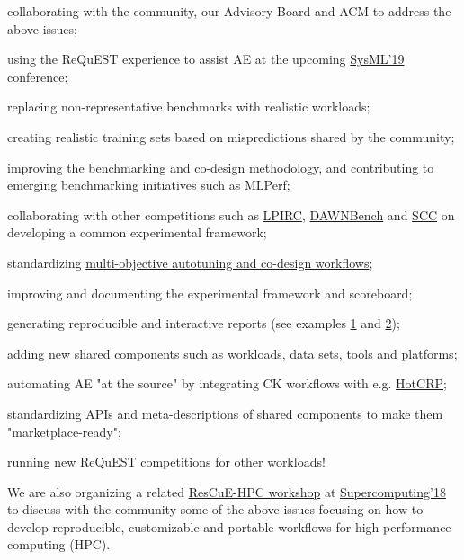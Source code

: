 \documentclass[10pt,onecolumn]{article}
\newenvironment{packed_itemize}{
\begin{itemize}
  \setlength{\itemsep}{1pt}
  \setlength{\parskip}{0pt}
  \setlength{\parsep}{0pt}
}{\end{itemize}}
\begin{document}
\begin{packed_itemize}

\item collaborating with the community, our Advisory Board and ACM to address the above issues;
\item using the ReQuEST experience to assist AE at the upcoming \href{http://sysml.cc}{SysML'19} conference;
\item replacing non-representative benchmarks with realistic workloads;
\item creating realistic training sets based on mispredictions shared by the community;
\item improving the benchmarking and co-design methodology, and contributing to emerging benchmarking initiatives such as \href{http://mlperf.org}{MLPerf};
\item collaborating with other competitions such as \href{https://rebootingcomputing.ieee.org/lpirc}{LPIRC}, \href{https://dawn.cs.stanford.edu/benchmark}{DAWNBench} and \href{https://sc18.supercomputing.org/experience/studentssc/student-cluster-competition}{SCC} on developing a common experimental framework;
\item standardizing \href{http://cKnowledge.org/rpi-crowd-tuning}{multi-objective autotuning and co-design workflows};
\item improving and documenting the experimental framework and scoreboard;
\item generating reproducible and interactive reports (see examples \href{http://cknowledge.org/repo/web.php?wcid=report:request-overview}{1} and \href{http://cKnowledge.org/rpi-crowd-tuning}{2});
\item adding new shared components such as workloads, data sets, tools and platforms;
\item automating AE "at the source" by integrating CK workflows with e.g. \href{https://hotcrp.com/}{HotCRP};
\item standardizing APIs and meta-descriptions of shared components to make them "marketplace-ready";
\item running new ReQuEST competitions for other workloads!

\end{packed_itemize}

We are also organizing a related \href{http://rescue-hpc.org}{ResCuE-HPC workshop}
at \href{https://sc18.supercomputing.org/}{Supercomputing'18} to discuss with the community some of the
above issues focusing on how to develop reproducible,
customizable and portable workflows for high-performance
computing (HPC).
\end{document}
